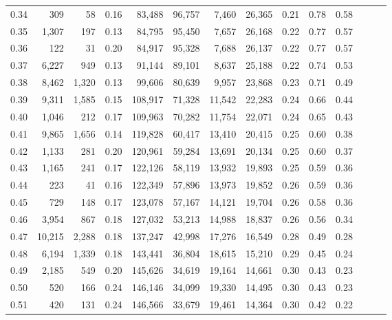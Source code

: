 \begin{tabular}{rrrrrrrrrrrrrr}
0.34 &     309 &     58 &  0.16 &   83,488 &   96,757 &   7,460 &  26,365 &  0.21 &  0.78 &      0.58 \\
0.35 &   1,307 &    197 &  0.13 &   84,795 &   95,450 &   7,657 &  26,168 &  0.22 &  0.77 &      0.57 \\
0.36 &     122 &     31 &  0.20 &   84,917 &   95,328 &   7,688 &  26,137 &  0.22 &  0.77 &      0.57 \\
0.37 &   6,227 &    949 &  0.13 &   91,144 &   89,101 &   8,637 &  25,188 &  0.22 &  0.74 &      0.53 \\
0.38 &   8,462 &  1,320 &  0.13 &   99,606 &   80,639 &   9,957 &  23,868 &  0.23 &  0.71 &      0.49 \\
0.39 &   9,311 &  1,585 &  0.15 &  108,917 &   71,328 &  11,542 &  22,283 &  0.24 &  0.66 &      0.44 \\
0.40 &   1,046 &    212 &  0.17 &  109,963 &   70,282 &  11,754 &  22,071 &  0.24 &  0.65 &      0.43 \\
0.41 &   9,865 &  1,656 &  0.14 &  119,828 &   60,417 &  13,410 &  20,415 &  0.25 &  0.60 &      0.38 \\
0.42 &   1,133 &    281 &  0.20 &  120,961 &   59,284 &  13,691 &  20,134 &  0.25 &  0.60 &      0.37 \\
0.43 &   1,165 &    241 &  0.17 &  122,126 &   58,119 &  13,932 &  19,893 &  0.25 &  0.59 &      0.36 \\
0.44 &     223 &     41 &  0.16 &  122,349 &   57,896 &  13,973 &  19,852 &  0.26 &  0.59 &      0.36 \\
0.45 &     729 &    148 &  0.17 &  123,078 &   57,167 &  14,121 &  19,704 &  0.26 &  0.58 &      0.36 \\
0.46 &   3,954 &    867 &  0.18 &  127,032 &   53,213 &  14,988 &  18,837 &  0.26 &  0.56 &      0.34 \\
0.47 &  10,215 &  2,288 &  0.18 &  137,247 &   42,998 &  17,276 &  16,549 &  0.28 &  0.49 &      0.28 \\
0.48 &   6,194 &  1,339 &  0.18 &  143,441 &   36,804 &  18,615 &  15,210 &  0.29 &  0.45 &      0.24 \\
0.49 &   2,185 &    549 &  0.20 &  145,626 &   34,619 &  19,164 &  14,661 &  0.30 &  0.43 &      0.23 \\
0.50 &     520 &    166 &  0.24 &  146,146 &   34,099 &  19,330 &  14,495 &  0.30 &  0.43 &      0.23 \\
0.51 &     420 &    131 &  0.24 &  146,566 &   33,679 &  19,461 &  14,364 &  0.30 &  0.42 &      0.22 \\

\end{tabular}
